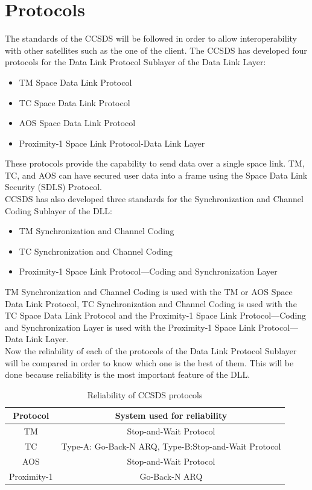 \documentclass[12pt,a4paper]{report}
\begin{document}
\section{Protocols}
The standards of the CCSDS will be followed in order to allow interoperability with other satellites such as the one of the client. The CCSDS has developed four protocols for the Data Link Protocol Sublayer of the Data Link Layer\cite{Secretariat2014}:
\begin{itemize}
\item TM Space Data Link Protocol
\item TC Space Data Link Protocol
\item AOS Space Data Link Protocol
\item Proximity-1 Space Link Protocol-Data Link Layer
\end{itemize}
These protocols provide the capability to send data over a single space link. TM, TC, and AOS can have secured user data into a frame using the Space Data Link Security (SDLS) Protocol.\\
 CCSDS has also developed three standards for the Synchronization and Channel Coding Sublayer of the DLL:
 \begin{itemize}
 \item TM Synchronization and Channel Coding
 \item TC Synchronization and Channel Coding
 \item Proximity-1 Space Link Protocol—Coding and Synchronization Layer
 \end{itemize}
TM Synchronization and Channel Coding is used with the TM or AOS Space Data Link
Protocol, TC Synchronization and Channel Coding is used with the TC Space Data Link Protocol and the Proximity-1 Space Link Protocol—Coding and Synchronization Layer is
used with the Proximity-1 Space Link Protocol—Data Link Layer.\\
Now the reliability of each of the protocols of the Data Link Protocol Sublayer will be compared in order to know which one is the best of them. This will be done because reliability is the most important feature of the DLL.
\begin{table}[H]
\begin{center}
\begin{tabular}{|c|c|}
\hline
\textbf{Protocol}&\textbf{System used for reliability}\\
\hline
TM&Stop-and-Wait Protocol\\
\hline
TC&Type-A: Go-Back-N ARQ, Type-B:Stop-and-Wait Protocol\\
\hline
AOS&Stop-and-Wait Protocol\\
\hline
Proximity-1&Go-Back-N ARQ\\
\hline
\end{tabular}
\caption{Reliability of CCSDS protocols}
\end{center}
\end{table}
\end{document}
